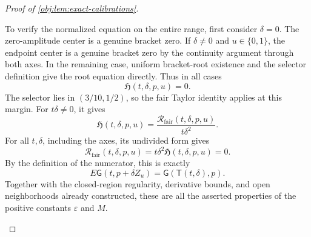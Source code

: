 \begin{proof}[Proof of \cref{obj:lem:exact-calibrations}]
\begin{enumerate}
To verify the normalized equation on the entire range, first consider \(\delta=0\). The zero-amplitude center is a genuine bracket zero. If \(\delta\ne0\) and \(u\in\{0,1\}\), the endpoint center is a genuine bracket zero by the continuity argument through both axes. In the remaining case, uniform bracket-root existence and the selector definition give the root equation directly. Thus in all cases
\[
\mathfrak H(t,\delta,p,u)=0.
\]
The selector lies in \((3/10,1/2)\), so the fair Taylor identity applies at this margin. For \(t\delta\ne0\), it gives
\[
\mathfrak H(t,\delta,p,u)
=
\frac{\mathcal R_{\mathrm{fair}}(t,\delta,p,u)}{t\delta^2}.
\]
For all \(t,\delta\), including the axes, its undivided form gives
\[
\mathcal R_{\mathrm{fair}}(t,\delta,p,u)
=t\delta^2\mathfrak H(t,\delta,p,u)=0.
\]
By the definition of the numerator, this is exactly
\[
E\mathsf G(t,p+\delta Z_u)
=\mathsf G(\mathsf T(t,\delta),p).
\]
Together with the closed-region regularity, derivative bounds, and open neighborhoods already constructed, these are all the asserted properties of the positive constants \(\varepsilon\) and \(M\).
\end{enumerate}
\end{proof}
